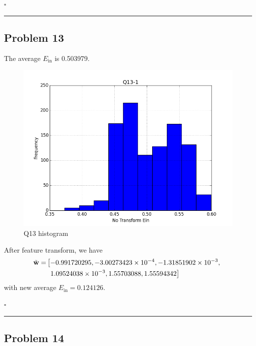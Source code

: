 \documentclass[12pt]{article}
\newcommand*{\QEDB}{\hfill\ensuremath{\square}}
\newcommand{\BF}[1]{{\bf#1}}
\newcommand{\SciNum}[2]{#1\times{10}^{#2}}
\newcommand{\horrule}[1]{\rule{\linewidth}{#1}}
\begin{document}
\QEDB

\horrule{0.5pt}

\newpage
\subsection*{Problem 13}

The average $E_{\text{in}}$ is 0.503979.
\begin{figure}[h]
	\centering
	\includegraphics[scale=0.3]{Q13-1.png}
	\caption{Q13 histogram}
	\label{Q13}
\end{figure}

After feature transform, we have
\begin{align}
\tilde{\BF{w}}=&\left[-0.991720295,\SciNum{-3.00273423}{-4},\SciNum{-1.31851902}{-3},\right.\\
\nonumber
&~\left.\SciNum{1.09524038}{-3},1.55703088,1.55594342\right]
\end{align}
with new average $E_{\text{in}}=0.124126$.

\QEDB

\horrule{0.5pt}

\subsection*{Problem 14}
\end{document}
